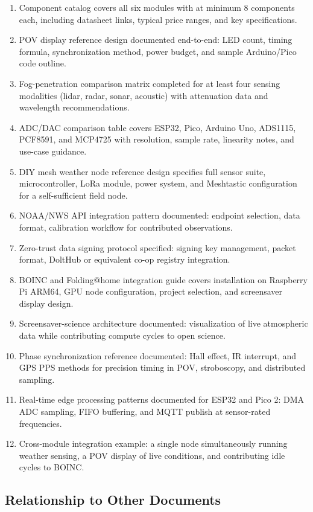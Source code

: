 \documentclass[11pt,letterpaper]{article}
\begin{document}
\begin{enumerate}
  \item Component catalog covers all six modules with at minimum 8 components each, including datasheet links, typical price ranges, and key specifications.
  \item POV display reference design documented end-to-end: LED count, timing formula, synchronization method, power budget, and sample Arduino/Pico code outline.
  \item Fog-penetration comparison matrix completed for at least four sensing modalities (lidar, radar, sonar, acoustic) with attenuation data and wavelength recommendations.
  \item ADC/DAC comparison table covers ESP32, Pico, Arduino Uno, ADS1115, PCF8591, and MCP4725 with resolution, sample rate, linearity notes, and use-case guidance.
  \item DIY mesh weather node reference design specifies full sensor suite, microcontroller, LoRa module, power system, and Meshtastic configuration for a self-sufficient field node.
  \item NOAA/NWS API integration pattern documented: endpoint selection, data format, calibration workflow for contributed observations.
  \item Zero-trust data signing protocol specified: signing key management, packet format, DoltHub or equivalent co-op registry integration.
  \item BOINC and Folding@home integration guide covers installation on Raspberry Pi ARM64, GPU node configuration, project selection, and screensaver display design.
  \item Screensaver-science architecture documented: visualization of live atmospheric data while contributing compute cycles to open science.
  \item Phase synchronization reference documented: Hall effect, IR interrupt, and GPS PPS methods for precision timing in POV, stroboscopy, and distributed sampling.
  \item Real-time edge processing patterns documented for ESP32 and Pico 2: DMA ADC sampling, FIFO buffering, and MQTT publish at sensor-rated frequencies.
  \item Cross-module integration example: a single node simultaneously running weather sensing, a POV display of live conditions, and contributing idle cycles to BOINC.
\end{enumerate}

\subsection{Relationship to Other Documents}
\end{document}
